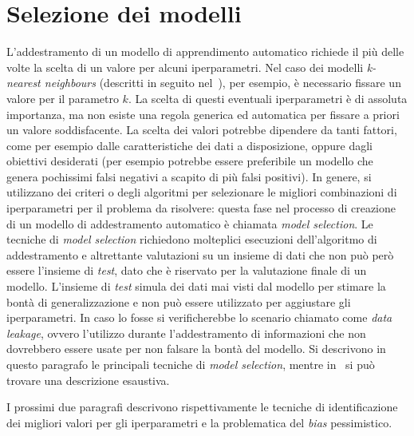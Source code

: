 \section{Selezione dei modelli}\label{sec:model_selection}
L'addestramento di un modello di apprendimento automatico richiede il più delle volte la scelta di un valore per alcuni iperparametri. 
Nel caso dei modelli \emph{k-nearest neighbours} (descritti in seguito nel~), per esempio, è necessario fissare un valore per il parametro $k$. 
La scelta di questi eventuali iperparametri è di assoluta importanza, ma non esiste una regola generica ed automatica per fissare a priori un valore soddisfacente. La scelta dei valori potrebbe dipendere da tanti fattori, come per esempio dalle caratteristiche dei dati a disposizione, oppure dagli obiettivi desiderati (per esempio potrebbe essere preferibile un modello che genera pochissimi falsi negativi a scapito di più falsi positivi).
In genere, si utilizzano dei criteri o degli algoritmi per selezionare le migliori combinazioni di iperparametri per il problema da risolvere: questa fase nel processo di creazione di un modello di addestramento automatico è chiamata \emph{model selection}.
Le tecniche di \emph{model selection} richiedono molteplici esecuzioni dell'algoritmo di addestramento e altrettante valutazioni su un insieme di dati che non può però essere l'insieme di \emph{test}, dato che è riservato per la valutazione finale di un modello. 
L'insieme di \emph{test} simula dei dati mai visti dal modello per stimare la bontà di generalizzazione e non può essere utilizzato per aggiustare gli iperparametri.
In caso lo fosse si verificherebbe lo scenario chiamato come \emph{data leakage}, ovvero l'utilizzo durante l'addestramento di informazioni che non dovrebbero essere usate per non falsare la bontà del modello.
Si descrivono in questo paragrafo le principali tecniche di \emph{model selection}, mentre in~\cite{model_evaluation} si può trovare una descrizione esaustiva.

I prossimi due paragrafi descrivono rispettivamente le tecniche di identificazione dei migliori valori per gli iperparametri e la problematica del \emph{bias} pessimistico.

